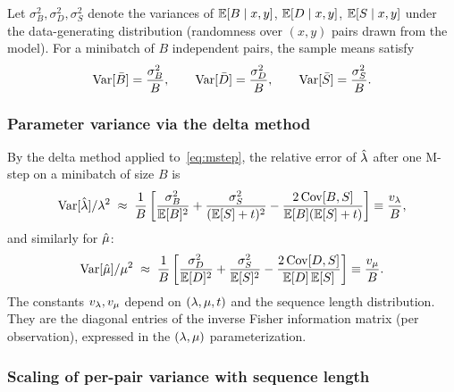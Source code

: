 Let $\sigma^2_B, \sigma^2_D, \sigma^2_S$ denote the variances of
$\mathbb{E}[B \mid x,y]$, $\mathbb{E}[D \mid x,y]$, $\mathbb{E}[S \mid x,y]$
under the data-generating distribution (randomness over $(x,y)$ pairs
drawn from the model).
For a minibatch of $B$ independent pairs, the sample means satisfy
\[
\mathrm{Var}[\bar B] = \frac{\sigma^2_B}{B}, \qquad
\mathrm{Var}[\bar D] = \frac{\sigma^2_D}{B}, \qquad
\mathrm{Var}[\bar S] = \frac{\sigma^2_S}{B}.
\]

\subsubsection{Parameter variance via the delta method}

By the delta method applied to~\eqref{eq:mstep}, the relative error
of $\hat{\lambda}$ after one M-step on a minibatch of size $B$ is
\begin{equation}\label{eq:delta-lambda}
\mathrm{Var}[\hat{\lambda}] / \lambda^2
\;\approx\;
\frac{1}{B}
\left[
  \frac{\sigma^2_B}{\mathbb{E}[B]^2}
  + \frac{\sigma^2_S}{(\mathbb{E}[S]+t)^2}
  - \frac{2\,\mathrm{Cov}[B,S]}{\mathbb{E}[B](\mathbb{E}[S]+t)}
\right]
\equiv \frac{v_\lambda}{B},
\end{equation}
and similarly for $\hat{\mu}$:
\begin{equation}\label{eq:delta-mu}
\mathrm{Var}[\hat{\mu}] / \mu^2
\;\approx\;
\frac{1}{B}
\left[
  \frac{\sigma^2_D}{\mathbb{E}[D]^2}
  + \frac{\sigma^2_S}{\mathbb{E}[S]^2}
  - \frac{2\,\mathrm{Cov}[D,S]}{\mathbb{E}[D]\,\mathbb{E}[S]}
\right]
\equiv \frac{v_\mu}{B}.
\end{equation}
The constants $v_\lambda, v_\mu$ depend on $(\lambda, \mu, t)$
and the sequence length distribution.
They are the diagonal entries of the inverse Fisher information matrix
(per observation), expressed in the $(\lambda, \mu)$ parameterization.

\subsubsection{Scaling of per-pair variance with sequence length}

